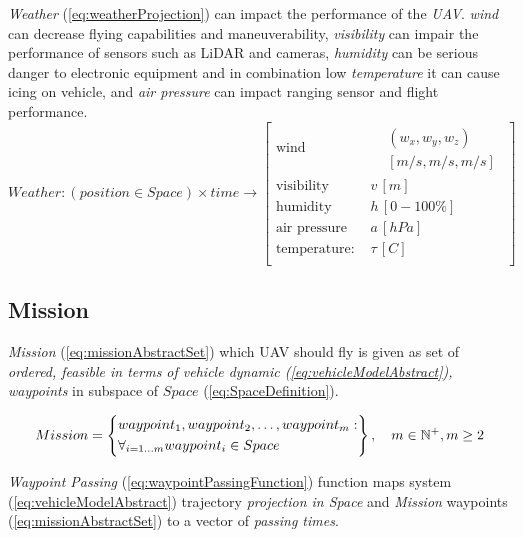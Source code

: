     \noindent\emph{Weather} (\ref{eq:weatherProjection}) can impact the performance of the \emph{UAV}. \emph{wind} can decrease flying capabilities and maneuverability, \emph{visibility} can impair the performance of sensors such as LiDAR and cameras, \emph{humidity} can be serious danger to electronic equipment and in combination low \emph{temperature} it can cause icing on vehicle, and \emph{air pressure} can impact ranging sensor and flight performance. 
    \begin{equation}\label{eq:weatherProjection}
        Weather:\left(position\in Space\right) \times time \to
        \left[
        \begin{aligned}
            \text{wind } & \begin{aligned}&(w_x,w_y,w_z)\\&[m/s,m/s,m/s]\end{aligned}\\
            \text{visibility }& v\,[m]\\
            \text{humidity }& h\,[0-100 \%] \\
            \text{air pressure }& a\,[hPa]\\
            \text{temperature: }& \tau\,[C]\\
        \end{aligned}
        \right]
    \end{equation}

\subsection{Mission}\label{s:mission}
    \emph{Mission} (\ref{eq:missionAbstractSet}) which UAV should fly is given as set of \emph{ordered, feasible in terms of vehicle dynamic (\ref{eq:vehicleModelAbstract}), waypoints} in subspace of $Space$ (\ref{eq:SpaceDefinition}).
    
    \begin{equation}\label{eq:missionAbstractSet}
        Mission = \left\{
        \begin{aligned}
            &waypoint_1, waypoint_2, \dots,waypoint_m:\\
            &\forall_{i=1\dots m} waypoint_i \in  Space
        \end{aligned}
        \right\}, \quad m\in\mathbb{N}^{+},m\ge2
    \end{equation}

    \emph{Waypoint Passing} (\ref{eq:waypointPassingFunction}) function maps system (\ref{eq:vehicleModelAbstract}) trajectory \emph{projection in Space} and \emph{Mission} waypoints (\ref{eq:missionAbstractSet}) to a vector of \emph{passing times}.
    
